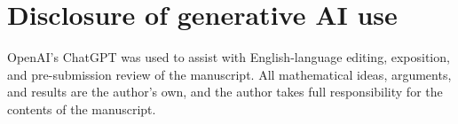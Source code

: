 \documentclass[11pt]{amsart}
\theoremstyle{plain}
\theoremstyle{definition}
\theoremstyle{remark}
\newenvironment{acks}[1][Acknowledgments]
        {\section*{#1}}
        {}
\begin{document}
\begin{acks}[Disclosure of generative AI use]
OpenAI's ChatGPT was used to assist with English-language editing, exposition, and pre-submission review of the manuscript. All mathematical ideas, arguments, and results are the author's own, and the author takes full responsibility for the contents of the manuscript.
\end{acks}



\end{document}
